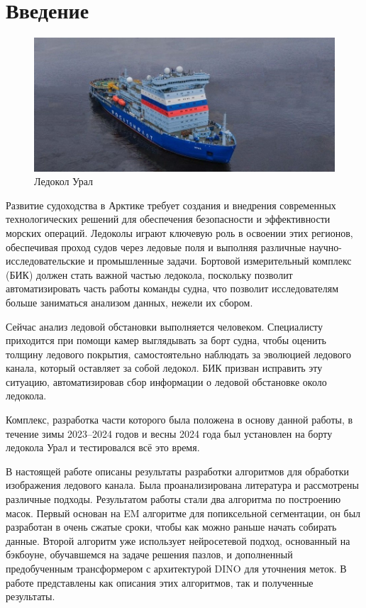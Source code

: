 \section{Введение}
\begin{figure}[htbp]
    \includegraphics[scale=0.5]{src/Introduction/assets/Ледокол.jpg}
\caption{Ледокол Урал}\label{fig:IceBreker}
\end{figure}
Развитие судоходства в Арктике требует создания и внедрения современных технологических решений для обеспечения безопасности и 
эффективности морских операций. Ледоколы играют ключевую роль в освоении этих регионов, обеспечивая проход судов через ледовые поля и выполняя различные 
научно-исследовательские и промышленные задачи. Бортовой измерительный комплекс (БИК) должен стать важной частью ледокола, поскольку позволит автоматизировать часть работы
команды судна, что позволит исследователям больше заниматься анализом данных, нежели их сбором.

Сейчас анализ ледовой обстановки выполняется человеком. Специалисту приходится при помощи камер выглядывать за борт судна, чтобы оценить толщину ледового
покрытия, самостоятельно наблюдать за эволюцией ледового канала, который оставляет за собой ледокол. БИК призван  исправить эту ситуацию, 
автоматизировав сбор информации о ледовой обстановке около ледокола.

Комплекс, разработка части которого была положена в основу данной работы, в течение зимы 2023--2024 годов и весны 2024 года был установлен на борту ледокола Урал и
тестировался всё это время.

В настоящей работе описаны результаты разработки алгоритмов для обработки изображения ледового канала. Была проанализирована литература и рассмотрены
различные подходы. Результатом работы стали два алгоритма по построению масок. Первый основан на EM алгоритме для попиксельной сегментации, он был разработан в очень сжатые сроки,
чтобы как можно раньше начать собирать данные. Второй алгоритм уже использует нейросетевой подход, основанный на бэкбоуне, обучавшемся на задаче решения пазлов, и дополненный 
предобученным трансформером с архитектурой DINO для уточнения меток. В работе представлены как описания этих алгоритмов, так и полученные результаты. 